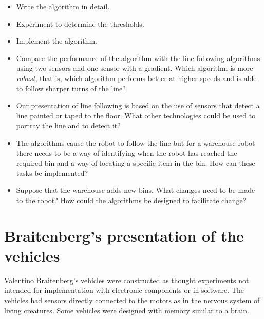 \begin{framed}
\begin{itemize}
\item Write the algorithm in detail.
\item Experiment to determine the thresholds.
\item Implement the algorithm.
\item Compare the performance of the algorithm with the line following algorithms using two sensors and one sensor with a gradient. Which algorithm is more \emph{robust}, that is, which algorithm performs better at higher speeds and is able to follow sharper turns of the line?
\end{itemize}
\end{framed}

\begin{framed}
\begin{itemize}
\item Our presentation of line following is based on the use of sensors that detect a line painted or taped to the floor. What other technologies could be used to portray the line and to detect it?
\item The algorithms cause the robot to follow the line but for a warehouse robot there needs to be a way of identifying when the robot has reached the required bin and a way of locating a specific item in the bin. How can these tasks be implemented?
\item Suppose that the warehouse adds new bins. What changes need to be made to the robot? How could the algorithms be designed to facilitate change?
\end{itemize}
\end{framed}

\section{Braitenberg's presentation of the vehicles}\label{s.abstract-vehicles}

Valentino Braitenberg's vehicles were constructed as thought experiments not intended for implementation with electronic components or in software. The vehicles had sensors directly connected to the motors as in the nervous system of living creatures. Some vehicles were designed with memory similar to a brain.

